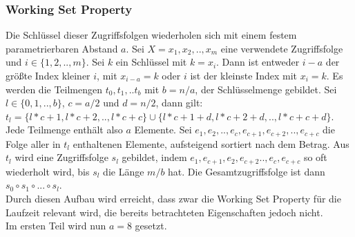 \documentclass[a4paper,12pt]{article}
\begin{document}
\subsubsection{Working Set Property} \label{testWork}
Die Schlüssel dieser Zugriffsfolgen wiederholen sich mit einem festem parametrierbaren Abstand $a$. 
Sei  $X = x_1, x_2,.., x_m$ eine verwendete Zugriffsfolge und $i \in \{1,2,..,m\}$. Sei $k$ ein Schlüssel mit $k = x_i$. Dann ist entweder $i-a$ der größte Index kleiner $i$, mit $x_{i-a} = k$ oder $i$ ist der kleinste Index mit $x_i = k$. Es werden die Teilmengen $t_0, t_1,.. t_b$ mit $b = n / a$, der  Schlüsselmenge gebildet. Sei $l \in \{0, 1,.., b\}$, $c = a/2$ und $d = n /2$, dann gilt: \\ $t_l = \{l * c + 1, l * c + 2,.., l * c + c\} \cup \{l * c + 1 + d, l * c + 2 + d,.., l * c + c + d\}$. Jede Teilmenge enthält also $a$ Elemente. Sei $e_1, e_2,.., e_c, e_{c+1}, e_{c+2},.., e_{c+c} $ die Folge aller in $t_l$ enthaltenen Elemente, aufsteigend sortiert nach dem Betrag. Aus $t_l$ wird eine Zugriffsfolge $s_l$ gebildet, indem  $e_1, e_{c+1}, e_2,e_{c+2}.., e_c, e_{c + c}$ so oft wiederholt wird, bis $s_l$ die Länge $m/b$ hat. Die Gesamtzugriffsfolge ist dann $s_0 \circ s_1 \circ...\circ s_l$. \\
Durch diesen Aufbau wird erreicht, dass zwar die Working Set Property für die Laufzeit relevant wird, die bereits betrachteten Eigenschaften jedoch nicht.\\
Im ersten Teil wird nun $a = 8$ gesetzt.
\end{document}
